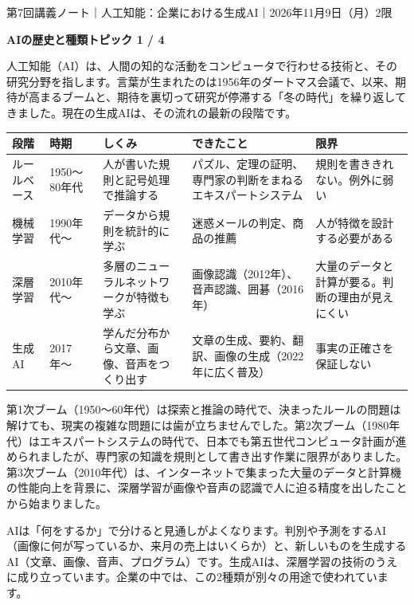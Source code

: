 \documentclass[paper=a4paper,fontsize=10pt,line_length=170mm,number_of_lines=46,baselineskip=1.6zw]{jlreq}
\newcommand\topichead[4]{%
  {\sffamily\footnotesize\color{grayt}#1\par}\vspace{1.5mm}
  {\sffamily\bfseries\LARGE #4}\hfill\colorbox{accent}{\sffamily\footnotesize\bfseries トピック #2 / #3}\par
  \vspace{1.2mm}{\color{ink}\hrule height 0.6pt}\vspace{3mm}}
\newcommand\subhead[1]{\par\vspace{2.6mm}{\sffamily\bfseries\large #1}\par\vspace{1.3mm}}
\begin{document}
\topichead{第7回講義ノート｜人工知能：企業における生成AI｜2026年11月9日（月）2限}{1}{4}{AIの歴史と種類}
人工知能（AI）は、人間の知的な活動をコンピュータで行わせる技術と、その研究分野を指します。言葉が生まれたのは1956年のダートマス会議で、以来、期待が高まるブームと、期待を裏切って研究が停滞する「冬の時代」を繰り返してきました。現在の生成AIは、その流れの最新の段階です。\par\vspace{1.2mm}
\subhead{4つの段階}
\begin{center}\small\renewcommand{\arraystretch}{1.15}\setlength{\tabcolsep}{1.5mm}
\begin{tabular}{|p{24.0mm}|p{32.5mm}|p{32.5mm}|p{32.5mm}|p{32.5mm}|}\arrayrulecolor{rulec}\hline
\rowcolor{papertwo}\sffamily\bfseries 段階 & \sffamily\bfseries 時期 & \sffamily\bfseries しくみ & \sffamily\bfseries できたこと & \sffamily\bfseries 限界\\\hline
ルールベース & 1950〜80年代 & 人が書いた規則と記号処理で推論する & パズル、定理の証明、専門家の判断をまねるエキスパートシステム & 規則を書ききれない。例外に弱い\\\hline
機械学習 & 1990年代〜 & データから規則を統計的に学ぶ & 迷惑メールの判定、商品の推薦 & 人が特徴を設計する必要がある\\\hline
深層学習 & 2010年代〜 & 多層のニューラルネットワークが特徴も学ぶ & 画像認識（2012年）、音声認識、囲碁（2016年） & 大量のデータと計算が要る。判断の理由が見えにくい\\\hline
生成AI & 2017年〜 & 学んだ分布から文章、画像、音声をつくり出す & 文章の生成、要約、翻訳、画像の生成（2022年に広く普及） & 事実の正確さを保証しない\\\hline
\end{tabular}\end{center}\vspace{0.5mm}
\subhead{ブームと冬の時代}
第1次ブーム（1950〜60年代）は探索と推論の時代で、決まったルールの問題は解けても、現実の複雑な問題には歯が立ちませんでした。第2次ブーム（1980年代）はエキスパートシステムの時代で、日本でも第五世代コンピュータ計画が進められましたが、専門家の知識を規則として書き出す作業に限界がありました。第3次ブーム（2010年代）は、インターネットで集まった大量のデータと計算機の性能向上を背景に、深層学習が画像や音声の認識で人に迫る精度を出したことから始まりました。\par\vspace{1.2mm}
\subhead{種類の見分け方}
AIは「何をするか」で分けると見通しがよくなります。判別や予測をするAI（画像に何が写っているか、来月の売上はいくらか）と、新しいものを生成するAI（文章、画像、音声、プログラム）です。生成AIは、深層学習の技術のうえに成り立っています。企業の中では、この2種類が別々の用途で使われています。\par\vspace{1.2mm}
\end{document}
